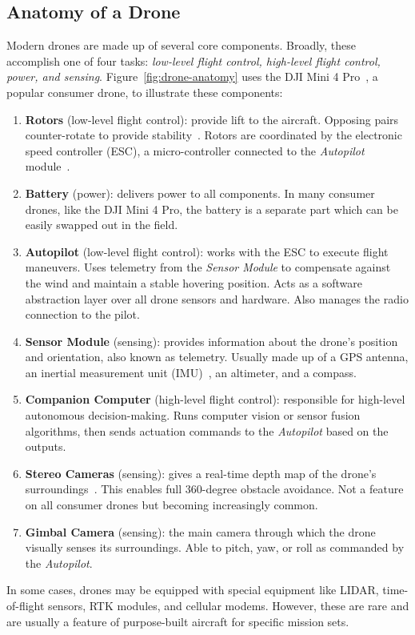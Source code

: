 \subsection{Anatomy of a Drone}
Modern drones are made up of several core components. Broadly, these accomplish one of four tasks: \textit{low-level flight control, high-level flight control, power, and sensing}. Figure~\ref{fig:drone-anatomy} uses the DJI Mini 4 Pro~\cite{DJIMini4}, a popular consumer drone, to illustrate these components:

\begin{enumerate}
    \item \textbf{Rotors} (low-level flight control): provide lift to the aircraft. Opposing pairs counter-rotate to provide stability~\cite{Allain2017}. Rotors are coordinated by the electronic speed controller (ESC), a micro-controller connected to the \textit{Autopilot} module~\cite{Nagel2023}.
    \item \textbf{Battery} (power): delivers power to all components. In many consumer drones, like the DJI Mini 4 Pro, the battery is a separate part which can be easily swapped out in the field.
    \item \textbf{Autopilot} (low-level flight control): works with the ESC to execute flight maneuvers. Uses telemetry from the \textit{Sensor Module} to compensate against the wind and maintain a stable hovering position. Acts as a software abstraction layer over all drone sensors and hardware. Also manages the radio connection to the pilot.
    \item \textbf{Sensor Module} (sensing): provides information about the drone's position and orientation, also known as telemetry. Usually made up of a GPS antenna, an inertial measurement unit (IMU)~\cite{IMU}, an altimeter, and a compass.
    \item \textbf{Companion Computer} (high-level flight control): responsible for high-level autonomous decision-making. Runs computer vision or sensor fusion algorithms, then sends actuation commands to the \textit{Autopilot} based on the outputs.
    \item \textbf{Stereo Cameras} (sensing): gives a real-time depth map of the drone's surroundings~\cite{Stereo}. This enables full 360-degree obstacle avoidance. Not a feature on all consumer drones but becoming increasingly common.
    \item \textbf{Gimbal Camera} (sensing): the main camera through which the drone visually senses its surroundings. Able to pitch, yaw, or roll as commanded by the \textit{Autopilot}.
\end{enumerate}
In some cases, drones may be equipped with special equipment like LIDAR, time-of-flight sensors, RTK modules, and cellular modems. However, these are rare and are usually a feature of purpose-built aircraft for specific mission sets. 

